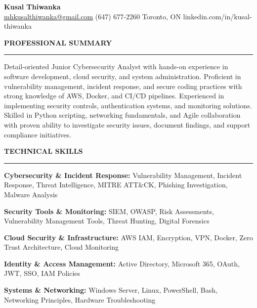 \documentclass[10pt,letterpaper]{article}
\begin{document}
\begin{center}
{\LARGE\textbf{Kusal Thiwanka}}\\[3pt]
\href{mailto:mhkusalthiwanka@gmail.com}{mhkusalthiwanka@gmail.com}\hspace{2em}%
(647) 677{-}2260\hspace{2em}%
Toronto, ON\hspace{2em}
linkedin.com/in/kusal-thiwanka
\end{center}

\vspace{6pt}

\textbf{PROFESSIONAL SUMMARY}\\[-8pt]
\noindent\rule{\textwidth}{1pt}

\vspace{-2pt}

Detail-oriented Junior Cybersecurity Analyst with hands-on experience in software development, cloud security, and system administration. Proficient in vulnerability management, incident response, and secure coding practices with strong knowledge of AWS, Docker, and CI/CD pipelines. Experienced in implementing security controls, authentication systems, and monitoring solutions. Skilled in Python scripting, networking fundamentals, and Agile collaboration with proven ability to investigate security issues, document findings, and support compliance initiatives.

\vspace{8pt}

\textbf{TECHNICAL SKILLS}\\[-8pt]
\noindent\rule{\textwidth}{1pt}

\vspace{-2pt}

\textbf{Cybersecurity \& Incident Response:} Vulnerability Management, Incident Response, Threat Intelligence, MITRE ATT\&CK, Phishing Investigation, Malware Analysis

\textbf{Security Tools \& Monitoring:} SIEM, OWASP, Risk Assessments, Vulnerability Management Tools, Threat Hunting, Digital Forensics

\textbf{Cloud Security \& Infrastructure:} AWS IAM, Encryption, VPN, Docker, Zero Trust Architecture, Cloud Monitoring

\textbf{Identity \& Access Management:} Active Directory, Microsoft 365, OAuth, JWT, SSO, IAM Policies

\textbf{Systems \& Networking:} Windows Server, Linux, PowerShell, Bash, Networking Principles, Hardware Troubleshooting
\end{document}
